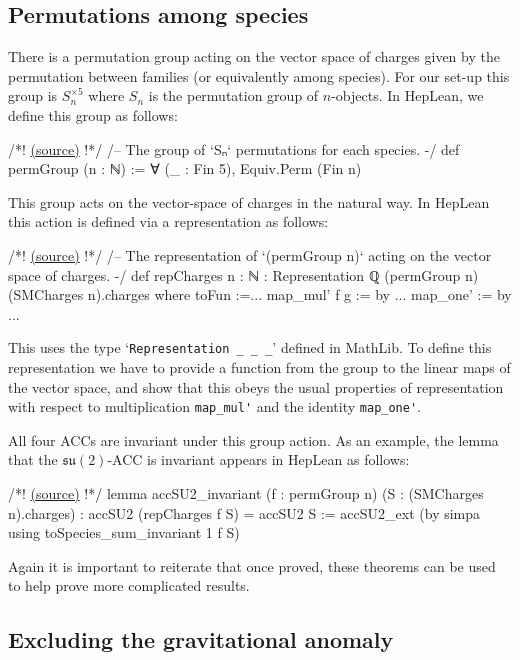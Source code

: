 \documentclass[a4paper, 11pt]{article}
\newcommand{\codeLink}[1]{
  \vspace{-0.5cm}\hfill\href{https://github.com/HEPLean/HepLean/blob/1b951994ae3d882242b02d23957ef1ee7fa05f3d/HepLean/#1}{(source)}
  }
\begin{document}
\subsection{Permutations among species}

There is a permutation group acting on the vector space of charges given by the permutation between families (or equivalently among species). For our set-up this group is $S_n^{\times 5}$ where $S_n$ is the permutation group of $n$-objects. In HepLean, we define this group as follows:
\begin{code}
/*!\codeLink{AnomalyCancellation/SM/Permutations.lean\#L27}!*/
/-- The group of `Sₙ` permutations for each species. -/
def permGroup (n : ℕ) := ∀ (_ : Fin 5),  Equiv.Perm (Fin n)
\end{code}

This group acts on the vector-space of charges in the natural way. In HepLean this action is defined via a representation as follows:
\begin{code}
/*!\codeLink{AnomalyCancellation/SM/Permutations.lean\#L55}!*/
/-- The representation of `(permGroup n)` acting on the vector space 
of charges. -/
def repCharges {n : ℕ} : Representation ℚ (permGroup n) (SMCharges n).charges where
	toFun :=...
	map_mul' f g := by ...
	map_one' := by ...
\end{code}
This uses the type `\lstinline|Representation _ _ _|' defined in MathLib. To define this representation we have to provide a function from the group to the linear maps of the vector space, and show that this obeys the usual properties of representation with respect to multiplication \lstinline|map_mul'| and the identity \lstinline|map_one'|. 

All four ACCs are invariant under this group action. As an example, the lemma that the $\mathfrak{su}(2)$-ACC is invariant appears in HepLean as follows: 
\begin{code}
/*!\codeLink{AnomalyCancellation/SM/Permutations.lean\#L96}!*/
lemma accSU2_invariant (f : permGroup n) (S : (SMCharges n).charges)  :
    accSU2 (repCharges f S) = accSU2 S :=
  accSU2_ext
    (by simpa using toSpecies_sum_invariant 1 f S)
\end{code}

Again it is important to reiterate that once proved, these theorems can be used to help prove more complicated results. 

\subsection{Excluding the gravitational anomaly}\label{sec:LohitsiriTong}
\end{document}
